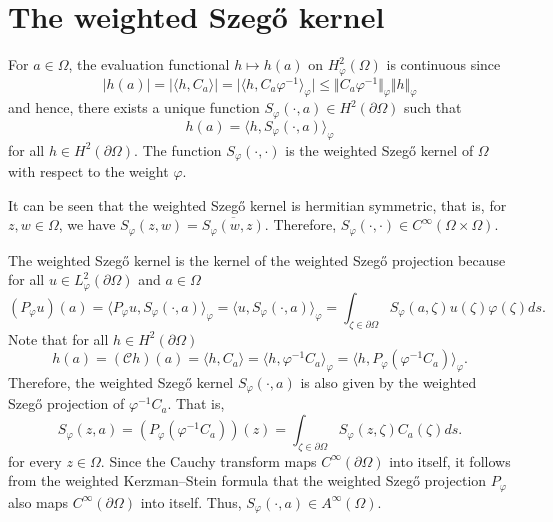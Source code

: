 \documentclass[11pt, reqno]{amsart}
\numberwithin{equation}{section}
\begin{document}
\section{The weighted Szeg\H{o} kernel}\label{Szego_kernel}

For $a\in\Omega$, the evaluation functional $h\mapsto h(a)$ on $H^2_{\varphi}(\Omega)$ is continuous since
\begin{equation}\label{szego}
\vert h(a)\vert = \vert \langle h, C_a \rangle \vert = \vert \langle h, C_a \varphi^{-1}\rangle_{\varphi}\vert \leq \Vert C_a \varphi^{-1} \Vert_{\varphi} \Vert h\Vert_{\varphi}
\end{equation}
and hence, there exists a unique function $S_{\varphi}(\cdot,a)\in H^2(\partial\Omega)$ such that 
\[
h(a)=\langle h, S_{\varphi}(\cdot, a)\rangle_{\varphi}
\]
for all $h\in H^2(\partial\Omega)$. The function $S_{\varphi}(\cdot,\cdot)$ is the weighted Szeg\H{o} kernel of $\Omega$ with respect to the weight $\varphi$. 

\medskip

It can be seen that the weighted Szeg\H{o} kernel is hermitian symmetric, that is, for $z, w\in\Omega$, we have
$
S_{\varphi}(z,w)= \overline{S_{\varphi}(w,z)}.
$
Therefore, $S_{\varphi}(\cdot,\cdot)\in C^{\infty}(\Omega\times\Omega)$. 

\medskip

The weighted Szeg\H{o} kernel is the kernel of the weighted Szeg\H{o} projection because for all $u\in L^2_{\varphi}(\partial\Omega)$ and $a\in\Omega$
\begin{equation}
(P_{\varphi}u)(a) = \langle P_{\varphi}u, S_{\varphi}(\cdot, a)\rangle_{\varphi}=\langle u, S_{\varphi}(\cdot, a)\rangle_{\varphi} = \int_{\zeta\in\partial\Omega}S_{\varphi}(a,\zeta)u(\zeta)\varphi(\zeta) ds.
\end{equation}
Note that for all $h\in H^2(\partial\Omega)$
\[
h(a) = (\mathcal{C}h)(a) = \langle h, C_a\rangle = \langle h, \varphi^{-1}C_a\rangle_{\varphi} =  \langle h, P_{\varphi}(\varphi^{-1}C_a)\rangle_{\varphi}.
\]
Therefore, the weighted Szeg\H{o} kernel $S_{\varphi}(\cdot,a)$ is also given by the weighted Szeg\H{o} projection of $\varphi^{-1}C_a$.
That is,
\begin{equation}
S_{\varphi}(z,a)=(P_{\varphi} (\varphi^{-1}C_a))(z)=\int_{\zeta\in\partial\Omega}S_{\varphi}(z,\zeta)C_a(\zeta) ds.
\end{equation}
for every $z\in\Omega$.
Since the Cauchy transform maps $C^{\infty}(\partial\Omega)$ into itself, it follows from the weighted Kerzman--Stein formula that the weighted Szeg\H{o} projection $P_{\varphi}$ also maps $C^{\infty}(\partial\Omega)$ into itself. Thus, $S_{\varphi}(\cdot,a)\in A^{\infty}(\Omega)$.
\end{document}
